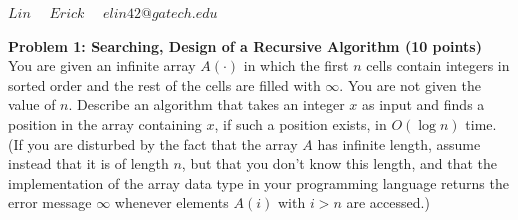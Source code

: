 \documentclass[a4paper,11pt]{article}
\begin{document}
\title{
}



\date{}


\newcommand{\DEF}[1]{{\em #1\/}}

\newcommand\chic{\chi_c}
\newcommand\C{\hbox{${\cal C}$}}
\newcommand{\RR}{\mbox{$\mathbb R$}}
\newcommand{\NN}{\mbox{$\mathbb N$}}
\newcommand{\ZZ}{\mbox{$\mathbb Z$}}
\newcommand{\eopf}{\raisebox{0.8ex}{\framebox{}}}
\newcommand{\dist}{\hbox{\rm d}}
\renewcommand\a{\alpha}
\renewcommand\b{\beta}
\renewcommand\c{\gamma}
\renewcommand\d{\delta}
\newcommand\D{\Delta}
\newcommand{\directedchi}{\mbox{$\vec{\chi}$}}
\newcommand{\directedE}{\mbox{$\vec{E}$}}
\newcommand{\directedG}{\mbox{$\vec{G}$}}
\newcommand{\directedK}{\mbox{$\vec{K}$}}




 $Lin \quad$
 $Erick \quad$
          $elin42@gatech.edu$\\

\bigskip

\noindent
{\bf Problem 1: Searching, Design of a Recursive Algorithm (10 points) }\\
You are given an infinite array $A(\cdot )$ in which the first $n$ cells contain integers in sorted order and
the rest of the cells are filled with $\infty$. You are not given the value of $n$. Describe an algorithm that
takes an integer $x$ as input and finds a position in the array containing $x$, if such a position exists,
in $ O(\log n)$ time. (If you are disturbed by the fact that the array $A$ has infinite length, assume
instead that it is of length $n$, but that you don't know this length, and that the implementation
of the array data type in your programming language returns the error message $\infty$ whenever
elements $A(i)$ with $ i > n$ are accessed.) \\
\end{document}
